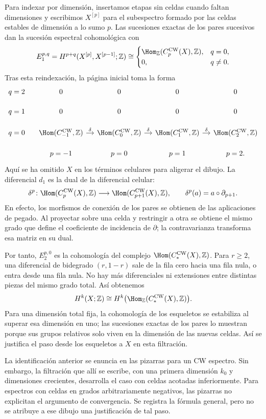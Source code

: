 Para indexar por dimensión, insertamos etapas sin celdas cuando faltan dimensiones y escribimos $X^{[p]}$ para el subespectro formado por las celdas estables de dimensión a lo sumo $p$. Las sucesiones exactas de los pares sucesivos dan la sucesión espectral cohomológica con
\[
E_1^{p,q}=H^{p+q}(X^{[p]},X^{[p-1]};\mathbb Z)
\cong
\begin{cases}
\Hom_{\mathbb Z}(C_p^{\mathrm{CW}}(X),\mathbb Z),&q=0,\\
0,&q\ne0.
\end{cases}
\]
Tras esta reindexación, la página inicial toma la forma
\[
\begin{tikzcd}[column sep=1.1em,row sep=1.2em]
q=2&0&0&0&0\\
q=1&0&0&0&0\\
q=0&\Hom(C_{-1}^{\mathrm{CW}},\mathbb Z)\arrow[r,"\delta"]
&\Hom(C_0^{\mathrm{CW}},\mathbb Z)\arrow[r,"\delta"]
&\Hom(C_1^{\mathrm{CW}},\mathbb Z)\arrow[r,"\delta"]
&\Hom(C_2^{\mathrm{CW}},\mathbb Z)\\
&p=-1&p=0&p=1&p=2.
\end{tikzcd}
\]
Aquí se ha omitido $X$ en los términos celulares para aligerar el dibujo. La diferencial $d_1$ es la dual de la diferencial celular:
\[
\delta^p\colon\Hom(C_p^{\mathrm{CW}}(X),\mathbb Z)
\longrightarrow\Hom(C_{p+1}^{\mathrm{CW}}(X),\mathbb Z),
\qquad\delta^p(a)=a\circ\partial_{p+1}.
\]
En efecto, los morfismos de conexión de los pares se obtienen de las aplicaciones de pegado. Al proyectar sobre una celda y restringir a otra se obtiene el mismo grado que define el coeficiente de incidencia de $\partial$; la contravarianza transforma esa matriz en su dual.

Por tanto, $E_2^{p,0}$ es la cohomología del complejo $\Hom(C_*^{\mathrm{CW}}(X),\mathbb Z)$. Para $r\ge2$, una diferencial de bidegrado $(r,1-r)$ sale de la fila cero hacia una fila nula, o entra desde una fila nula. No hay más diferenciales ni extensiones entre distintas piezas del mismo grado total. Así obtenemos
\[
H^k(X;\mathbb Z)\cong
H^k\bigl(\Hom_{\mathbb Z}(C_*^{\mathrm{CW}}(X),\mathbb Z)\bigr).
\]
Para una dimensión total fija, la cohomología de los esqueletos se estabiliza al superar esa dimensión en uno; las sucesiones exactas de los pares lo muestran porque sus grupos relativos solo viven en la dimensión de las nuevas celdas. Así se justifica el paso desde los esqueletos a $X$ en esta filtración.

\begin{nota}
La identificación anterior se enuncia en las pizarras para un CW espectro. Sin embargo, la filtración que allí se escribe, con una primera dimensión $k_0$ y dimensiones crecientes, desarrolla el caso con celdas acotadas inferiormente. Para espectros con celdas en grados arbitrariamente negativos, las pizarras no explicitan el argumento de convergencia. Se registra la fórmula general, pero no se atribuye a ese dibujo una justificación de tal paso.
\end{nota}


